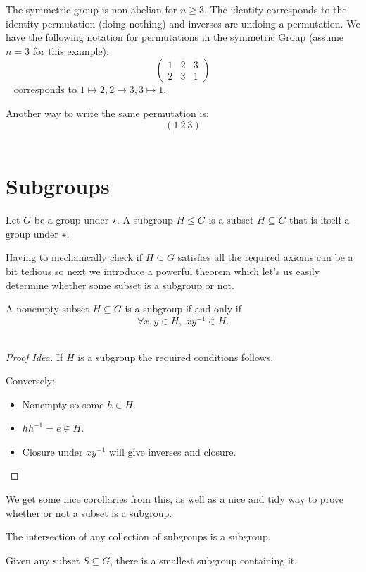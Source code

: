 The symmetric group is non-abelian for $n \geq 3$. The identity 
corresponds to the identity permutation (doing nothing) and inverses 
are undoing a permutation. 
We have the following notation for permutations in the symmetric Group
(assume $n = 3$ for this example): 
$$ 
    \begin{pmatrix}
        1 & 2 & 3 \\ 
        2 & 3 & 1
    \end{pmatrix}
$$ 
corresponds to $1 \mapsto 2, 2 \mapsto 3, 3 \mapsto 1$. 

Another way to write the same permutation is: 
$$ 
    \left(1 \: 2 \: 3\right)
$$ 

\newpage 
\section{Subgroups}
\begin{defn}[Subgroup]
    \label{defn:subgroup}
    Let $G$ be a group under $\star$.
    A subgroup $H \leq G$ is a subset $H \subseteq G$ that is itself 
    a group under $\star$.
\end{defn}

Having to mechanically check if $H \subseteq G$ satisfies all the 
required axioms can be a bit tedious so next we introduce a 
powerful theorem which let's us easily determine whether some 
subset is a subgroup or not. 

\begin{thm}
    \label{thm:subgroup_test}
    A nonempty subset $H \subseteq G$ is a subgroup if and only 
    if 
    $$ 
        \forall x,y \in H, \; xy^{-1} \in H.
    $$ 
\end{thm}
\begin{proof}[Proof Idea]
    If $H$ is a subgroup the required conditions follows. 

    Conversely: 
    \begin{itemize}
        \item Nonempty so some $h \in H$.
        \item $hh^{-1} = e \in H$. 
        \item Closure under $xy^{-1}$ will give inverses and 
            closure. 
    \end{itemize}
\end{proof}

We get some nice corollaries from this, as well as a nice and tidy 
way to prove whether or not a subset is a subgroup. 

\begin{cor}
    The intersection of any collection of subgroups is a subgroup. 

    Given any subset $S \subseteq G$, there is a smallest subgroup 
    containing it. 
\end{cor}

